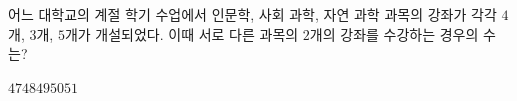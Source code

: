 \hspace*{2mm}\begin{minipage}[t]{\dimexpr\linewidth-2mm\relax}\vspace{0pt}
어느 대학교의 계절 학기 수업에서 인문학, 사회 과학, 자연 과학 과목의 강좌가 각각 $4$개, $3$개, $5$개가 개설되었다. 이때 서로 다른 과목의 $2$개의 강좌를 수강하는 경우의 수는? 
\begin{choices32}{$47$}{$48$}{$49$}{$50$}{$51$}\end{choices32}\end{minipage}
